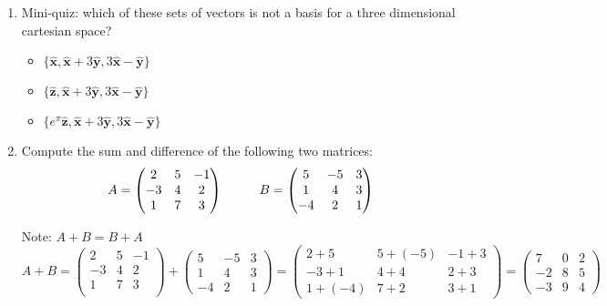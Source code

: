 \documentclass[fleqn]{article}
\begin{document}
\begin{enumerate}
\item Mini-quiz: which of these sets of vectors is not a basis for a three dimensional cartesian space? 
\begin{itemize}
\item $\{ \mathbf{\hat{x}}, \mathbf{\hat{x}}+3\mathbf{\hat{y}}, 3\mathbf{\hat{x}}-\mathbf{\hat{y}} \}$

\item $\{ \mathbf{\hat{z}}, \mathbf{\hat{x}}+3\mathbf{\hat{y}}, 3\mathbf{\hat{x}}-\mathbf{\hat{y}}\}$

\item $\{ e^\pi \mathbf{\hat{z}}, \mathbf{\hat{x}}+3\mathbf{\hat{y}}, 3\mathbf{\hat{x}}-\mathbf{\hat{y}}\}$
\end{itemize}


\item  Compute the sum and difference of the following two matrices:
$$A=\begin{pmatrix}
2 & 5 & -1 \\
-3 & 4 & 2 \\
1 & 7 & 3
\end{pmatrix} \hskip 1truecm B=\begin{pmatrix}
5 & -5 & 3 \\
1 & 4 & 3 \\
-4 & 2 & 1
\end{pmatrix}$$ 

Note: $A+B=B+A$
\\
\noindent
$A+B=
\begin{pmatrix}
    2 & 5 & -1 \\
    -3 & 4 & 2 \\ 
    1 & 7 & 3 \\ 
\end{pmatrix}
+
\begin{pmatrix}
  5 & -5 & 3 \\
  1 & 4 & 3 \\
  -4 & 2 & 1
\end{pmatrix}
=
\begin{pmatrix}
  2+5 & 5+(-5) & -1+3 \\
  -3+1 & 4+4 & 2+3 \\
  1+(-4) & 7+2 & 3+1
\end{pmatrix}
=
\begin{pmatrix}
  7 & 0 & 2 \\
  -2 & 8 & 5 \\
  -3 & 9 & 4
\end{pmatrix}
$


\end{enumerate}
\end{document}
